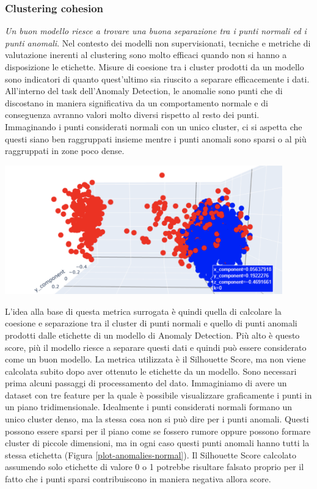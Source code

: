 \subsubsection{Clustering cohesion}
\textit{Un buon modello riesce a trovare una buona separazione tra i punti normali ed i punti anomali}.
Nel contesto dei modelli non supervisionati, tecniche e metriche di valutazione inerenti al clustering sono molto efficaci quando non si hanno a disposizione le etichette. Misure di coesione tra i cluster prodotti da un modello sono indicatori di quanto quest'ultimo sia riuscito a separare efficacemente i dati.
All'interno del task dell'Anomaly Detection, le anomalie sono punti che di discostano in maniera significativa da un comportamento normale e di conseguenza avranno valori molto diversi rispetto al resto dei punti. Immaginando i punti considerati normali con un unico cluster, ci si aspetta che questi siano ben raggruppati insieme mentre i punti anomali sono sparsi o al più raggruppati in zone poco dense.
\begin{center}
	\includegraphics[width=12cm, scale=1]{images/plot-anomalies-normal}
    \captionsetup{type=figure}
    \label{plot-anomalies-normal}
\end{center}
L'idea alla base di questa metrica surrogata è quindi quella di calcolare la coesione e separazione tra il cluster di punti normali e quello di punti anomali prodotti dalle etichette di un modello di Anomaly Detection. Più alto è questo score, più il modello riesce a separare questi dati e quindi può essere considerato come un buon modello.
La metrica utilizzata è il Silhouette Score, ma non viene calcolata subito dopo aver ottenuto le etichette da un modello. Sono necessari prima alcuni passaggi di processamento del dato.
Immaginiamo di avere un dataset con tre feature per la quale è possibile visualizzare graficamente i punti in un piano tridimensionale. Idealmente i punti considerati normali formano un unico cluster denso, ma la stessa cosa non si può dire per i punti anomali. 
Questi possono essere sparsi per il piano come se fossero rumore oppure possono formare cluster di piccole dimensioni, ma in ogni caso questi punti anomali hanno tutti la stessa etichetta (Figura \ref{plot-anomalies-normal}).
Il Silhouette Score calcolato assumendo solo etichette di valore 0 o 1 potrebbe risultare falsato proprio per il fatto che i punti sparsi contribuiscono in maniera negativa allora score.

